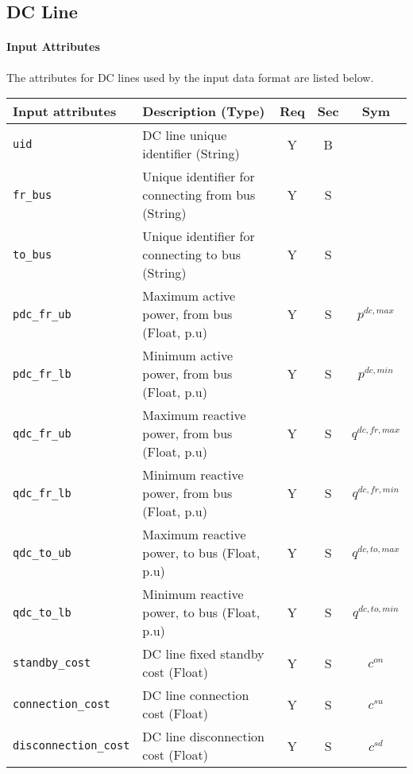 \documentclass{article}
\begin{document}
\subsection{DC Line}
\label{nom:dcline}

\paragraph{Input Attributes}
The attributes for DC lines
used by the input data format are listed below.

\begin{center}
\small
\begin{tabular}{ l | l | c | c | c |}
Input attributes & Description (Type) & Req & Sec & Sym\\
\hline
  {\tt uid} & DC line unique identifier (String)& Y & B &  \\
  {\tt fr\_bus} & Unique identifier for connecting from bus (String) & Y & S & \\
  {\tt to\_bus} & Unique identifier for connecting to bus (String)& Y & S & \\
  {\tt pdc\_fr\_ub} & Maximum active power, from bus (Float, p.u)& Y & S & $p^{dc,max}$\\
  {\tt pdc\_fr\_lb} & Minimum active power, from bus (Float, p.u)& Y & S & $p^{dc,min}$\\
  {\tt qdc\_fr\_ub} & Maximum reactive power, from bus (Float, p.u)& Y & S & $q^{dc,fr,max}$\\
  {\tt qdc\_fr\_lb} & Minimum reactive power, from bus (Float, p.u)& Y & S & $q^{dc,fr,min}$\\
  {\tt qdc\_to\_ub} & Maximum reactive power, to bus (Float, p.u)& Y & S & $q^{dc,to,max}$\\
  {\tt qdc\_to\_lb} & Minimum reactive power, to bus (Float, p.u)& Y & S & $q^{dc,to,min}$\\
   {\tt standby\_cost} & {DC line fixed standby cost (Float)} & Y & S & $c^{on}$\\
  {\tt connection\_cost} & {DC line connection cost (Float)} & Y & S & $c^{su}$\\
  {\tt disconnection\_cost} & {DC line disconnection cost (Float)} & Y & S & $c^{sd}$\\
  \hline
\end{tabular}
\end{center}
\end{document}

